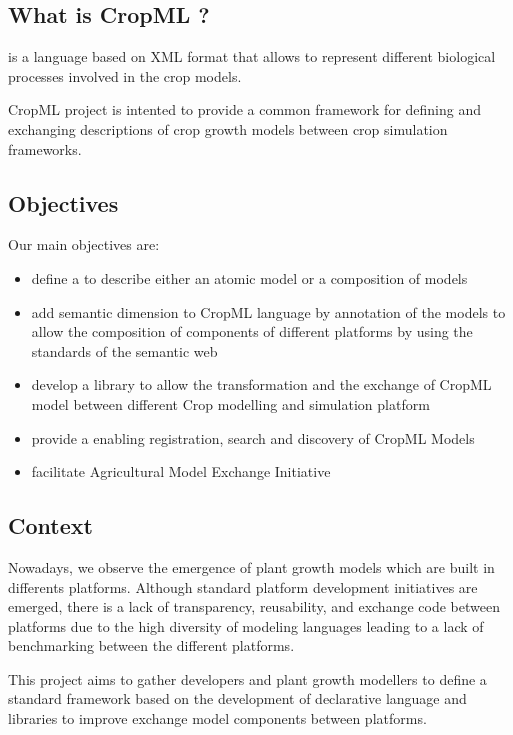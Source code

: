 \documentclass[letterpaper,10pt,english]{sphinxmanual}
\begin{document}
\subsection{What is CropML ?}
\label{\detokenize{user/overview:what-is-cropml}}
\begin{DUlineblock}{0em}
\item[]  is a language based on XML format that allows
to represent different biological processes involved
in the crop models.
\item[] CropML project is intented to provide
a common framework for defining and exchanging descriptions
of crop growth models between crop simulation frameworks.
\end{DUlineblock}


\subsection{Objectives}
\label{\detokenize{user/overview:objectives}}
Our main objectives are:
\begin{itemize}
\item {} 
define a  to describe either an atomic model or a composition of models

\item {} 
add semantic dimension to CropML language by annotation of the models to allow the composition of components of different platforms by using the standards of the semantic web

\item {} 
develop a library to allow the transformation and the exchange of CropML model between different Crop modelling and simulation platform

\item {} 
provide a  enabling registration, search and discovery of CropML Models

\item {} 
facilitate Agricultural Model Exchange Initiative

\end{itemize}


\subsection{Context}
\label{\detokenize{user/overview:context}}
\begin{DUlineblock}{0em}
\item[] Nowadays, we observe the emergence of plant growth models which are built
in differents  platforms. Although standard platform development initiatives
are emerged, there is a lack of  transparency, reusability, and exchange
code between platforms due to the high diversity of modeling languages
leading to a lack of benchmarking between the different platforms.
\item[] This project aims to gather developers and plant growth modellers
to define a standard framework based on the development of declarative language and libraries to improve exchange model components between platforms.
\end{DUlineblock}
\end{document}
